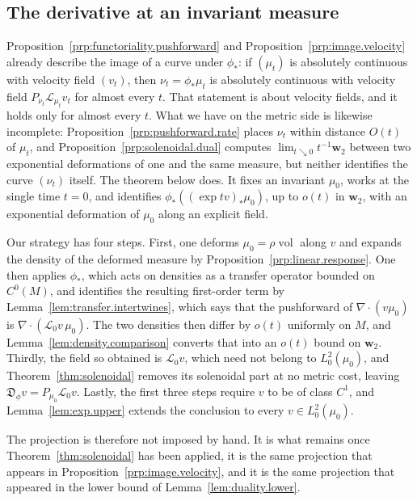 \documentclass[11pt,reqno]{amsart}
\theoremstyle{plain}
\theoremstyle{definition}
\newcommand{\dw}{\mathbf{w}_2}
\newcommand{\D}{\mathfrak{D}}
\newcommand{\Transf}{\mathcal{L}}
\DeclareMathOperator{\vol}{vol}
\begin{document}
\subsection{The derivative at an invariant measure}
\label{sec:derivative.acim}

Proposition~\ref{prp:functoriality.pushforward} and Proposition~\ref{prp:image.velocity} already describe the image of a curve under \( \phi_\ast \): if \( (\mu_t) \) is absolutely continuous with velocity field \( (v_t) \), then \( \nu_t=\phi_\ast\mu_t \) is absolutely continuous with velocity field \( P_{\nu_t}\Transf_{\mu_t}v_t \) for almost every \( t \).
That statement is about velocity fields, and it holds only for almost every \( t \).
What we have on the metric side is likewise incomplete: Proposition~\ref{prp:pushforward.rate} places \( \nu_t \) within distance \( O(t) \) of \( \mu_t \), and Proposition~\ref{prp:solenoidal.dual} computes \( \lim_{t\searrow0}t^{-1}\dw \) between two exponential deformations of one and the same measure, but neither identifies the curve \( (\nu_t) \) itself.
The theorem below does.
It fixes an invariant \( \mu_0 \), works at the single time \( t=0 \), and identifies \( \phi_\ast\left((\exp tv)_\ast\mu_0\right) \), up to \( o(t) \) in \( \dw \), with an exponential deformation of \( \mu_0 \) along an explicit field.

Our strategy has four steps.
First, one deforms \( \mu_0=\rho\vol \) along \( v \) and expands the density of the deformed measure by Proposition~\ref{prp:linear.response}.
One then applies \( \phi_\ast \), which acts on densities as a transfer operator bounded on \( C^0(M) \), and identifies the resulting first-order term by Lemma~\ref{lem:transfer.intertwines}, which says that the pushforward of \( \nabla\!\cdot(v\mu_0) \) is \( \nabla\!\cdot(\Transf_0v\,\mu_0) \).
The two densities then differ by \( o(t) \) uniformly on \( M \), and Lemma~\ref{lem:density.comparison} converts that into an \( o(t) \) bound on \( \dw \).
Thirdly, the field so obtained is \( \Transf_0v \), which need not belong to \( L^2_0(\mu_0) \), and Theorem~\ref{thm:solenoidal} removes its solenoidal part at no metric cost, leaving \( \D_\phi v=P_{\mu_0}\Transf_0v \).
Lastly, the first three steps require \( v \) to be of class \( C^1 \), and Lemma~\ref{lem:exp.upper} extends the conclusion to every \( v\in L^2_0(\mu_0) \).

The projection is therefore not imposed by hand.
It is what remains once Theorem~\ref{thm:solenoidal} has been applied, it is the same projection that appears in Proposition~\ref{prp:image.velocity}, and it is the same projection that appeared in the lower bound of Lemma~\ref{lem:duality.lower}.
\end{document}
